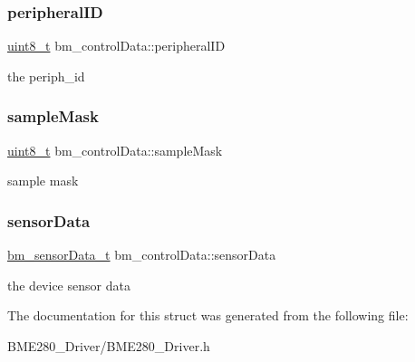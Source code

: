 \subsubsection{\texorpdfstring{peripheral\+ID}{peripheralID}}
{\footnotesize\ttfamily \hyperlink{vl53l0x__types_8h_aba7bc1797add20fe3efdf37ced1182c5}{uint8\+\_\+t} bm\+\_\+control\+Data\+::peripheral\+ID}

the periph\+\_\+id \mbox{\label{structbm__controlData_a895f3f4166087e92d8217c116f397bcf}} 
\subsubsection{\texorpdfstring{sample\+Mask}{sampleMask}}
{\footnotesize\ttfamily \hyperlink{vl53l0x__types_8h_aba7bc1797add20fe3efdf37ced1182c5}{uint8\+\_\+t} bm\+\_\+control\+Data\+::sample\+Mask}

sample mask \mbox{\label{structbm__controlData_a193dc45579d41ddf5273944cc8e0280c}} 
\subsubsection{\texorpdfstring{sensor\+Data}{sensorData}}
{\footnotesize\ttfamily \hyperlink{structBM__sensorData}{bm\+\_\+sensor\+Data\+\_\+t} bm\+\_\+control\+Data\+::sensor\+Data}

the device sensor data 

The documentation for this struct was generated from the following file\+:\begin{DoxyCompactItemize}
\item 
B\+M\+E280\+\_\+\+Driver/B\+M\+E280\+\_\+\+Driver.\+h\end{DoxyCompactItemize}
